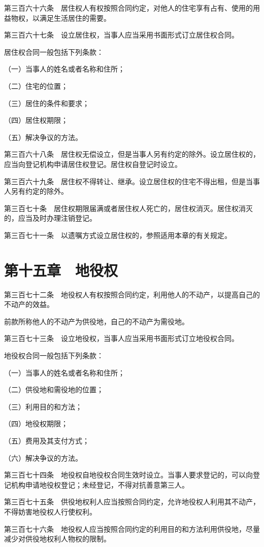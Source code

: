 \documentclass[UTF8,12pt,a4paper]{ctexbook}
\begin{document}
第三百六十六条　居住权人有权按照合同约定，对他人的住宅享有占有、使用的用益物权，以满足生活居住的需要。

第三百六十七条　设立居住权，当事人应当采用书面形式订立居住权合同。

居住权合同一般包括下列条款：

（一）当事人的姓名或者名称和住所；

（二）住宅的位置；

（三）居住的条件和要求；

（四）居住权期限；

（五）解决争议的方法。

第三百六十八条　居住权无偿设立，但是当事人另有约定的除外。设立居住权的，应当向登记机构申请居住权登记。居住权自登记时设立。

第三百六十九条　居住权不得转让、继承。设立居住权的住宅不得出租，但是当事人另有约定的除外。

第三百七十条　居住权期限届满或者居住权人死亡的，居住权消灭。居住权消灭的，应当及时办理注销登记。

第三百七十一条　以遗嘱方式设立居住权的，参照适用本章的有关规定。

\section*{第十五章　地役权}

第三百七十二条　地役权人有权按照合同约定，利用他人的不动产，以提高自己的不动产的效益。

前款所称他人的不动产为供役地，自己的不动产为需役地。

第三百七十三条　设立地役权，当事人应当采用书面形式订立地役权合同。

地役权合同一般包括下列条款：

（一）当事人的姓名或者名称和住所；

（二）供役地和需役地的位置；

（三）利用目的和方法；

（四）地役权期限；

（五）费用及其支付方式；

（六）解决争议的方法。

第三百七十四条　地役权自地役权合同生效时设立。当事人要求登记的，可以向登记机构申请地役权登记；未经登记，不得对抗善意第三人。

第三百七十五条　供役地权利人应当按照合同约定，允许地役权人利用其不动产，不得妨害地役权人行使权利。

第三百七十六条　地役权人应当按照合同约定的利用目的和方法利用供役地，尽量减少对供役地权利人物权的限制。
\end{document}
